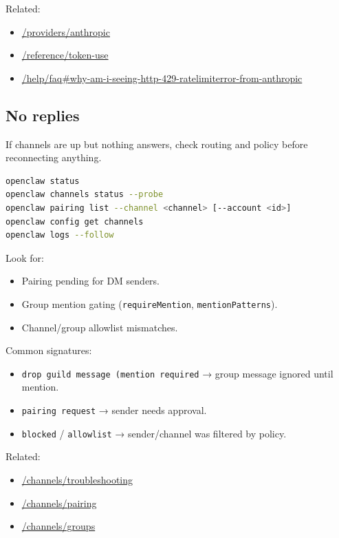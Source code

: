 Related:

\begin{itemize}
  \item \href{/providers/anthropic}{/providers/anthropic}
  \item \href{/reference/token-use}{/reference/token-use}
  \item \href{/help/faq\#why-am-i-seeing-http-429-ratelimiterror-from-anthropic}{/help/faq\#why-am-i-seeing-http-429-ratelimiterror-from-anthropic}
\end{itemize}


\subsection{No replies}


If channels are up but nothing answers, check routing and policy before reconnecting anything.

\begin{lstlisting}[language=bash]
openclaw status
openclaw channels status --probe
openclaw pairing list --channel <channel> [--account <id>]
openclaw config get channels
openclaw logs --follow
\end{lstlisting}


Look for:

\begin{itemize}
  \item Pairing pending for DM senders.
  \item Group mention gating (\texttt{requireMention}, \texttt{mentionPatterns}).
  \item Channel/group allowlist mismatches.
\end{itemize}


Common signatures:

\begin{itemize}
  \item \texttt{drop guild message (mention required} → group message ignored until mention.
  \item \texttt{pairing request} → sender needs approval.
  \item \texttt{blocked} / \texttt{allowlist} → sender/channel was filtered by policy.
\end{itemize}


Related:

\begin{itemize}
  \item \href{/channels/troubleshooting}{/channels/troubleshooting}
  \item \href{/channels/pairing}{/channels/pairing}
  \item \href{/channels/groups}{/channels/groups}
\end{itemize}



